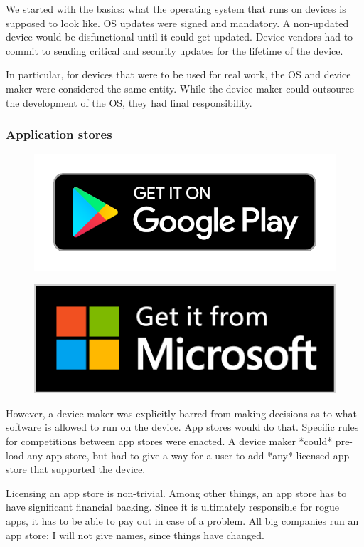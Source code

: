 We started with the basics:
what the operating system that runs on devices is supposed to look like.
OS updates were signed and mandatory.
A non-updated device would be disfunctional until it could get updated.
Device vendors had to commit to sending critical and security updates
for the lifetime of the device.

In particular,
for devices that were to be used for real work,
the OS and device maker were considered the same entity.
While the device maker could outsource the development of the OS,
they had final responsibility.

\begin{frame}[fragile]
\frametitle{Application stores}


\begin{figure}
\includegraphics{google_badge}
\end{figure}
\begin{figure}
\includegraphics[scale=0.15]{microsoft_badge}
\end{figure}


\end{frame}

However,
a device maker was explicitly barred from making decisions
as to what software is allowed to run on the device.
App stores would do that.
Specific rules for competitions between app stores were enacted.
A device maker
*could*
pre-load any app store,
but had to give a way for a user to add
*any*
licensed app store that supported the device.

Licensing an app store is non-trivial.
Among other things,
an app store has to have significant financial backing.
Since it is ultimately responsible for rogue apps,
it has to be able to pay out in case of a problem.
All big companies run an app store:
I will not give names,
since things have changed.

